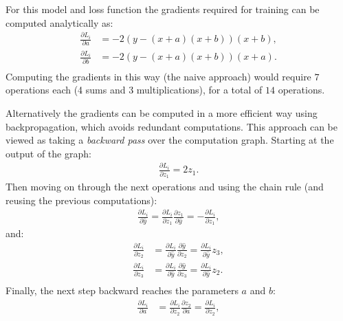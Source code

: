 \begin{example}
For this model and loss function the gradients required for training can be computed analytically as:
\begin{equation*}
\begin{split}
\frac{\partial L_i}{\partial a} &= -2(y - (x+a)(x+b))(x+b), \\
\frac{\partial L_i}{\partial b} &= -2(y - (x+a)(x+b))(x+a).\\
\end{split}
\end{equation*}
Computing the gradients in this way (the naive approach) would require $7$ operations each (4 sums and 3 multiplications), for a total of $14$ operations.

Alternatively the gradients can be computed in a more efficient way using backpropagation, which avoids redundant computations. This approach can be viewed as taking a \textit{backward pass} over the computation graph. Starting at the output of the graph:
\begin{equation*}
\begin{split}
\frac{\partial L_i}{\partial z_1} = 2z_1.
\end{split}
\end{equation*}
Then moving on through the next operations and using the chain rule (and reusing the previous computations):
\begin{equation*}
\begin{split}
\frac{\partial L_i}{\partial \hat{y}} = \frac{\partial L_i}{\partial z_1}\frac{\partial z_1}{\partial \hat{y}} = -\frac{\partial L_i}{\partial z_1},
\end{split}
\end{equation*}
and:
\begin{equation*}
\begin{split}
\frac{\partial L_i}{\partial z_2} &= \frac{\partial L_i}{\partial \hat{y}}\frac{\partial \hat{y}}{\partial z_2} = \frac{\partial L_i}{\partial \hat{y}}z_3, \\
\frac{\partial L_i}{\partial z_3} &= \frac{\partial L_i}{\partial \hat{y}}\frac{\partial \hat{y}}{\partial z_3} = \frac{\partial L_i}{\partial \hat{y}}z_2. \\
\end{split}
\end{equation*}
Finally, the next step backward reaches the parameters $a$ and $b$:
\begin{equation*}
\begin{split}
\frac{\partial L_i}{\partial a} &= \frac{\partial L_i}{\partial z_2}\frac{\partial z_2}{\partial a} = \frac{\partial L_i}{\partial z_2}, \\

\end{split}
\end{equation*}
\end{example}
